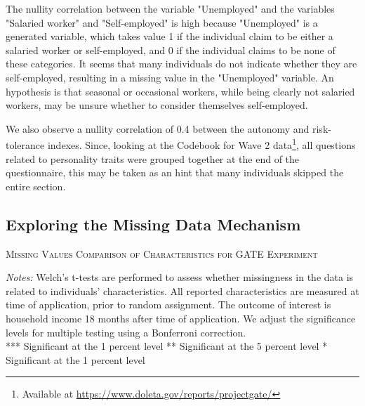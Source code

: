 The nullity correlation between the variable "Unemployed" and the variables "Salaried worker" and "Self-employed" is high because "Unemployed" is a generated variable, which takes value 1 if the individual claim to be either a salaried worker or self-employed, and 0 if the individual claims to be none of these categories. It seems that many individuals do not indicate whether they are self-employed, resulting in a missing value in the "Unemployed" variable. An hypothesis is that seasonal or occasional workers, while being clearly not salaried workers, may be unsure whether to consider themselves self-employed.

We also observe a nullity correlation of 0.4 between the autonomy and risk-tolerance indexes. Since, looking at the Codebook for Wave 2 data\footnote{Available at \url{https://www.doleta.gov/reports/projectgate/}}, all questions related to personality traits were grouped together at the end of the questionnaire, this may be taken as an hint that many individuals skipped the entire section.


\subsection{Exploring the Missing Data Mechanism}

\begin{table}[t!]
\centering
\caption{\textsc{Missing Values Comparison of Characteristics for GATE Experiment}}
\begin{adjustbox}{width=\textwidth,totalheight=\textheight,keepaspectratio}

\end{adjustbox}


\label{tab:table_missing}
\medskip
\raggedright
\footnotesize
\textit{Notes:} Welch's t-tests are performed to assess whether missingness in the data is related to individuals' characteristics.
All reported characteristics are measured at time of application, prior to random assignment. The outcome of interest is household income 18 months after time of application. We adjust the significance levels for multiple testing using a Bonferroni correction. \\
*** Significant at the 1 percent level ** Significant at the 5 percent level * Significant at the 1 percent level
\end{table}

